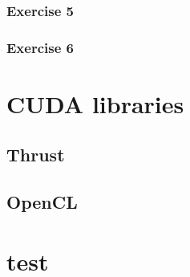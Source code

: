 \documentclass[12px,oz]{report}
\begin{document}
		\subsection{Exercise 5}
		
		\subsection{Exercise 6}
	
\chapter{CUDA libraries}
\label{ch-libraries}


	\section{Thrust}
	\label{sec-thrust}
	
	
	\section{OpenCL}
	\label{sec-opencl}
	

\cite{McCool2012}
\cite{udacity:parallel}




\appendix
\chapter{test}
\end{document}
